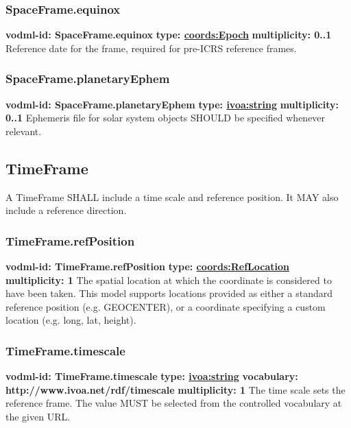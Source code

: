     \subsubsection{SpaceFrame.equinox}
      \textbf{vodml-id: SpaceFrame.equinox} \newline
      \textbf{type: \hyperref[sect:Epoch]{coords:Epoch}} \newline
      \textbf{multiplicity: 0..1} \newline 
      Reference date for the frame, required for pre-ICRS reference frames.

    \subsubsection{SpaceFrame.planetaryEphem}
      \textbf{vodml-id: SpaceFrame.planetaryEphem} \newline
      \textbf{type: \hyperref[sect:ivoa]{ivoa:string}} \newline
      \textbf{multiplicity: 0..1} \newline 
      Ephemeris file for solar system objects SHOULD be specified whenever relevant.


  \subsection{TimeFrame}
  \label{sect:TimeFrame}
    A TimeFrame SHALL include a time scale and reference position. It MAY also include a reference direction.

    \subsubsection{TimeFrame.refPosition}
      \textbf{vodml-id: TimeFrame.refPosition} \newline
      \textbf{type: \hyperref[sect:RefLocation]{coords:RefLocation}} \newline
      \textbf{multiplicity: 1} \newline 
      The spatial location at which the coordinate is considered to have been taken. This model supports locations provided as either a standard reference position (e.g. GEOCENTER), or a coordinate specifying a custom location (e.g. long, lat, height).

    \subsubsection{TimeFrame.timescale}
      \textbf{vodml-id: TimeFrame.timescale} \newline
      \textbf{type: \hyperref[sect:ivoa]{ivoa:string}} \newline
      \textbf{vocabulary: http://www.ivoa.net/rdf/timescale} \newline
      \textbf{multiplicity: 1} \newline
      The time scale sets the reference frame. The value MUST be selected from the controlled vocabulary at the given URL.

